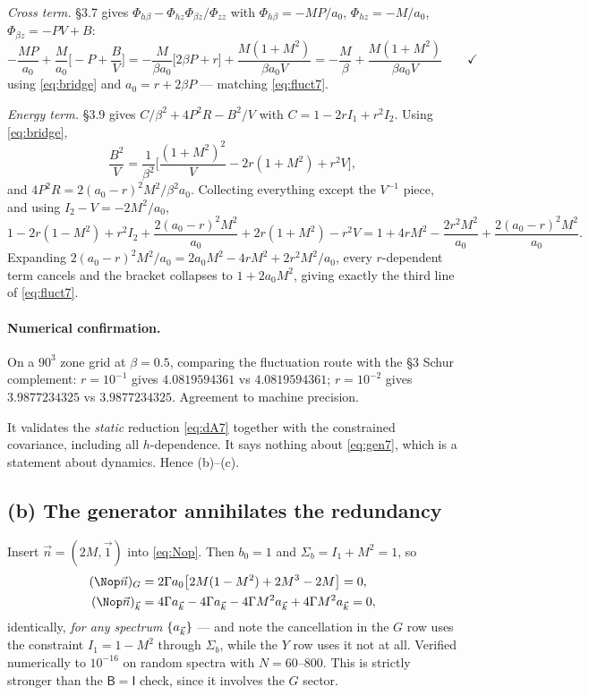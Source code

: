 \emph{Cross term.} \S3.7 gives $\Phi_{h\beta}-\Phi_{hz}\Phi_{\beta z}/\Phi_{zz}$ with
$\Phi_{h\beta}=-MP/a_0$, $\Phi_{hz}=-M/a_0$, $\Phi_{\beta z}=-PV+B$:
\begin{equation}
  -\frac{MP}{a_0}+\frac{M}{a_0}\Big[-P+\frac{B}{V}\Big]
  =-\frac{M}{\beta a_0}\big[2\beta P+r\big]+\frac{M(1+M^{2})}{\beta a_0V}
  =-\frac{M}{\beta}+\frac{M(1+M^{2})}{\beta a_0V} \qquad\checkmark
\end{equation}
using \eqref{eq:bridge} and $a_0=r+2\beta P$ --- matching \eqref{eq:fluct7}.

\emph{Energy term.} \S3.9 gives $C/\beta^{2}+4P^{2}R-B^{2}/V$ with
$C=1-2rI_1+r^{2}I_2$. Using \eqref{eq:bridge},
\begin{equation}
  \frac{B^{2}}{V}=\frac{1}{\beta^{2}}\Big[\frac{(1+M^{2})^{2}}{V}-2r(1+M^{2})+r^{2}V\Big],
\end{equation}
and $4P^{2}R=2(a_0-r)^{2}M^{2}/\beta^{2}a_0$. Collecting everything except the
$V^{-1}$ piece, and using $I_2-V=-2M^{2}/a_0$,
\begin{equation}
  1-2r(1-M^{2})+r^{2}I_2+\frac{2(a_0-r)^{2}M^{2}}{a_0}+2r(1+M^{2})-r^{2}V
  =1+4rM^{2}-\frac{2r^{2}M^{2}}{a_0}+\frac{2(a_0-r)^{2}M^{2}}{a_0} .
\end{equation}
Expanding $2(a_0-r)^{2}M^{2}/a_0=2a_0M^{2}-4rM^{2}+2r^{2}M^{2}/a_0$, every $r$-dependent
term cancels and the bracket collapses to $1+2a_0M^{2}$, giving exactly the third line of
\eqref{eq:fluct7}. \checkmark

\paragraph{Numerical confirmation.} On a $90^{3}$ zone grid at $\beta=0.5$, comparing the
fluctuation route with the \S3 Schur complement: $r=10^{-1}$ gives
$4.0819594361$ vs $4.0819594361$; $r=10^{-2}$ gives $3.9877234325$ vs $3.9877234325$.
Agreement to machine precision.

 It validates the \emph{static} reduction
\eqref{eq:dA7} together with the constrained covariance, including all $h$-dependence. It
says nothing about \eqref{eq:gen7}, which is a statement about dynamics. Hence (b)--(c).

\subsection{(b) The generator annihilates the redundancy}
Insert $\vec n=(2M,\vec 1)$ into \eqref{eq:Nop}. Then $b_0=1$ and
$\Sigma_b=I_1+M^{2}=1$, so
\begin{align}
  (\Nop\vec n)_G&=2\Gamma a_0\big[2M(1-M^{2})+2M^{3}-2M\big]=0,\\
  (\Nop\vec n)_{\bk}&=4\Gamma a_{\bk}-4\Gamma a_{\bk}-4\Gamma M^{2}a_{\bk}+4\Gamma M^{2}a_{\bk}=0 ,
\end{align}
identically, \emph{for any spectrum} $\{a_{\vec k}\}$ --- and note the cancellation in the $G$
row uses the constraint $I_1=1-M^2$ through $\Sigma_b$, while the $Y$ row uses it not at
all. Verified numerically to $10^{-16}$ on random spectra with $N=60$--$800$. This is
strictly stronger than the $\mathsf B=\mathsf I$ check, since it involves the $G$ sector.

